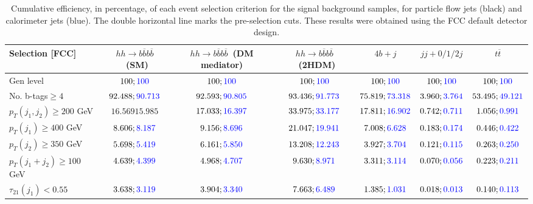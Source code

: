 \begin{landscape}
		\begin{table}
			\centering
			\caption{Cumulative efficiency, in percentage, of each event selection criterion for the signal background samples, for particle flow jets (black) and calorimeter jets (blue). The double horizontal line marks the pre-selection cuts. These results were obtained using the FCC default detector design.}
			\begin{tabular}{lcccccc}
				\toprule 
				\textbf{Selection [FCC]} & $hh\rightarrow b\overline{b}b\overline{b}$~(SM) & $hh\rightarrow b\overline{b}b\overline{b}$~(DM mediator) & $hh\rightarrow b\overline{b}b\overline{b}$~(2HDM) & $4b+j$  & $jj+0/1/2 j$ & $t\overline{t}$ \\
				\midrule
				Gen level & $100;\textcolor{blue}{100}$ & $100;\textcolor{blue}{100}$ &$100;\textcolor{blue}{100}$& $100;\textcolor{blue}{100}$& $100;\textcolor{blue}{100}$& $100;\textcolor{blue}{100}$ \\
				\rowcolor{black!7}No. b-tags$\geq 4$&$92.488;\textcolor{blue}{90.713}$&$92.593;\textcolor{blue}{90.805}$&$93.436;\textcolor{blue}{91.773}$&$75.819;\textcolor{blue}{73.318}$&$3.960;\textcolor{blue}{3.764}$&$53.495;\textcolor{blue}{49.121}$\\
				$p_T(j_1,j_2)\geq200$ GeV & $16.569{15.985}$ & $17.033;\textcolor{blue}{16.397}$&$33.975;\textcolor{blue}{33.177}$ &$17.811;\textcolor{blue}{16.902}$&$0.742;\textcolor{blue}{0.711}$&$1.056;\textcolor{blue}{0.991}$\\
				\midrule \midrule
				\rowcolor{black!7}$p_T(j_1)\geq 400$ GeV & $8.606;\textcolor{blue}{8.187}$ &$9.156;\textcolor{blue}{8.696}$  &$21.047;\textcolor{blue}{19.941}$&$7.008;\textcolor{blue}{6.628}$&$0.183;\textcolor{blue}{0.174}$&$0.446;\textcolor{blue}{0.422}$\\ 
				$p_T(j_2)\geq 350$ GeV & $5.698;\textcolor{blue}{5.419}$& $6.161;\textcolor{blue}{5.850}$&$13.208;\textcolor{blue}{12.243}$&$3.927;\textcolor{blue}{3.704}$&$0.121;\textcolor{blue}{0.115}$&$0.263;\textcolor{blue}{0.250}$\\
				\rowcolor{black!7}$p_T(j_1+j_2)\geq 100$ GeV &$4.639;\textcolor{blue}{4.399}$ & $4.968;\textcolor{blue}{4.707}$ &$9.630;\textcolor{blue}{8.971}$&$3.311;\textcolor{blue}{3.114}$&$0.070;\textcolor{blue}{0.056}$&$0.223;\textcolor{blue}{0.211}$\\
				$\tau_{21}(j_1)<0.55$ & $3.638;\textcolor{blue}{3.119}$& $3.904;\textcolor{blue}{3.340}$&$7.663;\textcolor{blue}{6.489}$&$1.385;\textcolor{blue}{1.031}$&$0.018;\textcolor{blue}{0.013}$&$0.140;\textcolor{blue}{0.113}$\\

\end{tabular}
\end{table}
\end{landscape}
